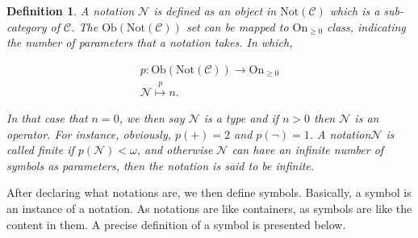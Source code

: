 \documentclass{aims}
\numberwithin{equation}{section}
\newtheorem{definition}{Definition}	%
\numberwithin{theorem}{section}	%
\numberwithin{axiom}{section}	%
\numberwithin{definition}{section}	%
\begin{document}
	\begin{definition}
		A {notation} \(\mathcal{N}\) is defined as an object in \(\text{Not}(\mathcal{C})\) which is a sub-category of \(\mathcal{C}\). The \(\text{Ob}(\text{Not}(\mathcal{C}))\) set can be mapped to \(\text{On}_{\geq 0}\) class, indicating the number of parameters that a notation takes. In which,
		
		\begin{equation}
			\begin{gathered}
				\mathit{p}:\text{Ob}(\text{Not}(\mathcal{C}))\to \text{On}_{\geq 0}\\
				\mathcal{N}\overset{\mathit{p}}{\mapsto}n.
			\end{gathered}
		\end{equation}
		
		In that case that \(n=0\), we then say \(\mathcal{N}\) is a{ type} and if \(n>0\) then \(\mathcal{N}\) is an{ operator}. For instance, obviously, \(\mathit{p}(+)=2\) and \(\mathit{p}(\neg )=1\). A notation\(\mathcal{N}\)  is called{ finite} if \(\mathit{p}(\mathcal{N})<\omega\), and otherwise \(\mathcal{N}\) can have an infinite number of symbols as parameters, then the notation is said to be{ infinite}.
	\end{definition}
	
	After declaring what notations are, we then define symbols. Basically, a symbol is an instance of a notation. As notations are like containers, as symbols are like the content in them. A precise definition of a symbol is presented below.
	
\end{document}
